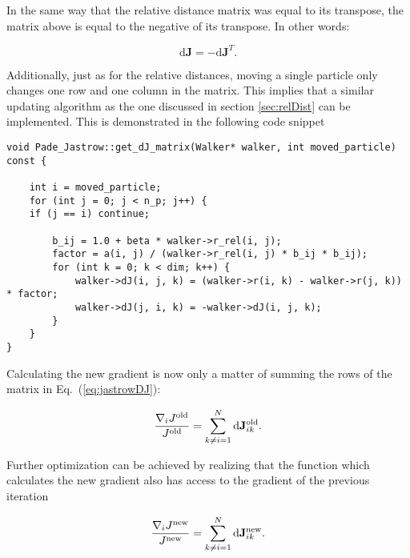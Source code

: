 In the same way that the relative distance matrix was equal to its transpose, the matrix above is equal to the negative of its transpose. In other words:

\begin{equation}
 \mathrm{d}\mathbf{J} = -\mathrm{d}\mathbf{J}^T.
\end{equation}

Additionally, just as for the relative distances, moving a single particle only changes one row and one column in the matrix. This implies that a similar updating algorithm as the one discussed in section \ref{sec:relDist} can be implemented. This is demonstrated in the following code snippet

\vspace{0.25cm}
\begin{lstlisting}[caption={The updating algorithm for the three dimensional matrix used in the Padé Jastrow gradient. Pay close attention to line 11, where the symmetry property is exploited by setting the transposed term equal to the negative of an already calculated term.}]
void Pade_Jastrow::get_dJ_matrix(Walker* walker, int moved_particle) const {
    
    int i = moved_particle;
    for (int j = 0; j < n_p; j++) {
	if (j == i) continue;
	
        b_ij = 1.0 + beta * walker->r_rel(i, j);
        factor = a(i, j) / (walker->r_rel(i, j) * b_ij * b_ij);
        for (int k = 0; k < dim; k++) {
            walker->dJ(i, j, k) = (walker->r(i, k) - walker->r(j, k)) * factor;
            walker->dJ(j, i, k) = -walker->dJ(i, j, k);
        }
    }
}
\end{lstlisting}


Calculating the new gradient is now only a matter of summing the rows of the matrix in Eq.~(\ref{eq:jastrowDJ}):

\begin{equation}
\frac{\nabla_i J^\mathrm{old}}{J^\mathrm{old}} = \sum_{k \ne i = 1}^N \mathrm{d}\mathbf{J}^\mathrm{old}_{ik}.\label{eq:jastrowGraDJold}
\end{equation}

Further optimization can be achieved by realizing that the function which calculates the new gradient also has access to the gradient of the previous iteration

\begin{equation}
 \frac{\nabla_i J^\mathrm{new}}{J^\mathrm{new}} = \sum_{k \ne i = 1}^N \mathrm{d}\mathbf{J}^\mathrm{new}_{ik}. \label{eq:jastrowGradDJnew}
\end{equation}

